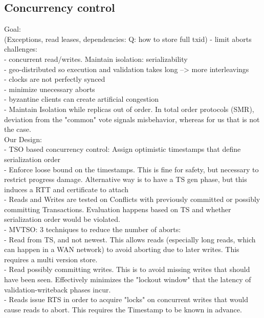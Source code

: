 \subsection{Concurrency control}
Goal: \\(Exceptions, read leases, dependencies: Q: how to store full txid)
- limit aborts\\

challenges:\\
- concurrent read/writes. Maintain isolation: serializability\\
- geo-distributed so execution and validation takes long --> more interleavings\\
- clocks are not perfectly synced\\
- minimize unecessary aborts\\
- byzantine clients can create artificial congestion\\

- Maintain Isolation while replicas out of order. In total order protocols (SMR), deviation from the "common" vote signals misbehavior, whereas for us that is not the case. \\

Our Design:\\
- TSO based concurrency control: Assign optimistic timestamps that define serialization order\\
- Enforce loose bound on the timestamps. This is fine for safety, but necessary to restrict progress damage. Alternative way is to have a TS gen phase, but this induces a RTT and certificate to attach\\
- Reads and Writes are tested on Conflicts with previously committed or possibly committing Transactions. Evaluation happens based on TS and whether serialization order would be violated.\\
- MVTSO: 3 techniques to reduce the number of aborts:\\
	- Read from TS, and not newest. This allows reads (especially long reads, which can happen in a WAN network) to avoid aborting due to later writes. This requires a multi version store.\\
	- Read possibly committing writes. This is to avoid missing writes that should have been seen. Effectively minimizes the "lockout window" that the latency of validation-writeback phases incur.\\
	- Reads issue RTS in order to acquire "locks" on concurrent writes that would cause reads to abort. This requires the Timestamp to be known in advance. \\
	

